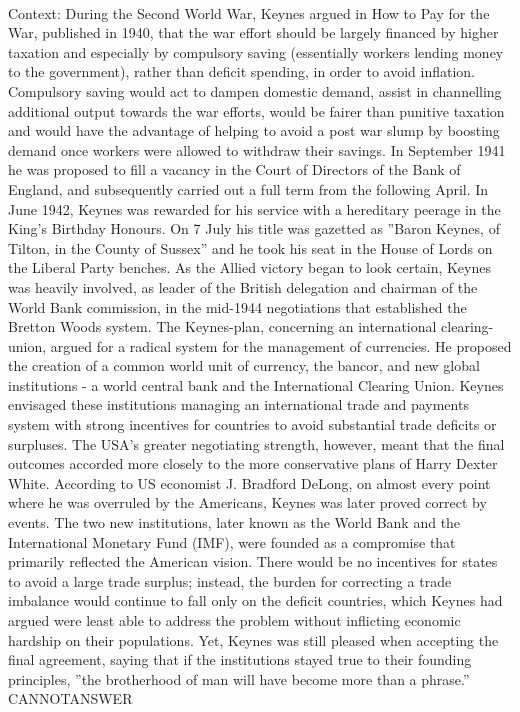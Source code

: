\documentclass[11pt,a4paper, onecolumn]{article}
\begin{document}
\\ Context: During the Second World War, Keynes argued in How to Pay for the War, published in 1940, that the war effort should be largely financed by higher taxation and especially by compulsory saving (essentially workers lending money to the government), rather than deficit spending, in order to avoid inflation. Compulsory saving would act to dampen domestic demand, assist in channelling additional output towards the war efforts, would be fairer than punitive taxation and would have the advantage of helping to avoid a post war slump by boosting demand once workers were allowed to withdraw their savings. In September 1941 he was proposed to fill a vacancy in the Court of Directors of the Bank of England, and subsequently carried out a full term from the following April. In June 1942, Keynes was rewarded for his service with a hereditary peerage in the King's Birthday Honours. On 7 July his title was gazetted as ''Baron Keynes, of Tilton, in the County of Sussex'' and he took his seat in the House of Lords on the Liberal Party benches. As the Allied victory began to look certain, Keynes was heavily involved, as leader of the British delegation and chairman of the World Bank commission, in the mid-1944 negotiations that established the Bretton Woods system. The Keynes-plan, concerning an international clearing-union, argued for a radical system for the management of currencies. He proposed the creation of a common world unit of currency, the bancor, and new global institutions - a world central bank and the International Clearing Union. Keynes envisaged these institutions managing an international trade and payments system with strong incentives for countries to avoid substantial trade deficits or surpluses. The USA's greater negotiating strength, however, meant that the final outcomes accorded more closely to the more conservative plans of Harry Dexter White. According to US economist J. Bradford DeLong, on almost every point where he was overruled by the Americans, Keynes was later proved correct by events. The two new institutions, later known as the World Bank and the International Monetary Fund (IMF), were founded as a compromise that primarily reflected the American vision. There would be no incentives for states to avoid a large trade surplus; instead, the burden for correcting a trade imbalance would continue to fall only on the deficit countries, which Keynes had argued were least able to address the problem without inflicting economic hardship on their populations. Yet, Keynes was still pleased when accepting the final agreement, saying that if the institutions stayed true to their founding principles, ''the brotherhood of man will have become more than a phrase.'' CANNOTANSWER
\end{document}
